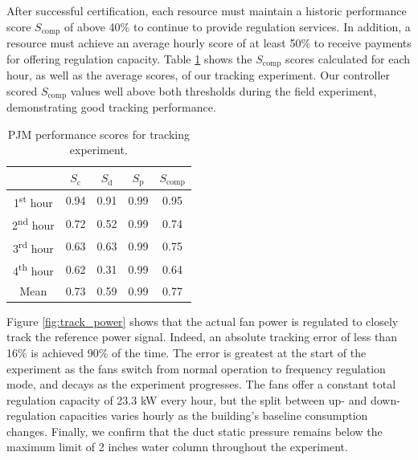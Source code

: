 After successful certification, each resource must maintain a historic performance score $S_\text{comp}$ of above 40\% to continue to provide regulation services. In addition, a resource must achieve an average hourly score of at least 50\% to receive payments for offering regulation capacity. 
Table \ref{tab:tracking} shows the $S_\text{comp}$ scores calculated for each hour, as well as the average scores, of our tracking experiment.
Our controller scored $S_\text{comp}$ values well above both thresholds during the field experiment, demonstrating good tracking performance. 


\begin{table}[b]
\centering
\begin{tabular}{c | c c c | c}
\toprule
 & $S_\text{c}$ & $S_\text{d}$ & $S_\text{p}$ & $S_\text{comp}$  \\ \hline
1\textsuperscript{st} hour & 0.94 & 0.91 & 0.99 & 0.95\\
2\textsuperscript{nd} hour & 0.72 & 0.52 & 0.99 & 0.74 \\
3\textsuperscript{rd} hour & 0.63 & 0.63 & 0.99 & 0.75 \\
4\textsuperscript{th} hour & 0.62 & 0.31 & 0.99 & 0.64 \\ %
Mean & 0.73 & 0.59 & 0.99 & 0.77 \\
\bottomrule
\end{tabular}
\caption{PJM performance scores for tracking experiment.}
\label{tab:tracking}
\end{table}

Figure \ref{fig:track_power} shows that the actual fan power is regulated to closely track the reference power signal. Indeed, an absolute tracking error of less than 16\% is achieved 90\% of the time. The error is greatest at the start of the experiment as the fans switch from normal operation to frequency regulation mode, and decays as the experiment progresses.
The fans offer a constant total regulation capacity of 23.3 kW every hour, %
but the split between up- and down-regulation capacities varies hourly as the building's baseline consumption changes. 
Finally, we confirm that the duct static pressure remains below the maximum limit of 2 inches water column throughout the experiment.

